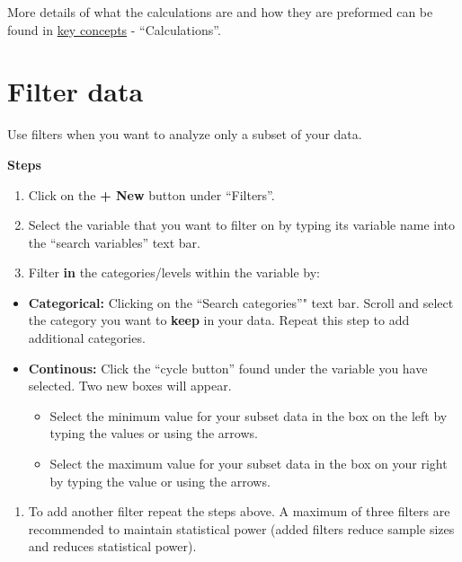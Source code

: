 \documentclass[]{book}
\providecommand{\tightlist}{%
  \setlength{\itemsep}{0pt}\setlength{\parskip}{0pt}}
\begin{document}
More details of what the calculations are and how they are preformed can
be found in \protect\hyperlink{keyconcepts}{key concepts} -
``Calculations''.

\section{Filter data}\label{filter-data}

Use filters when you want to analyze only a subset of your data.

\textbf{Steps}

\begin{enumerate}
\def\labelenumi{\arabic{enumi}.}
\item
  Click on the \textbf{+ New} button under ``Filters''.
\item
  Select the variable that you want to filter on by typing its variable
  name into the ``search variables'' text bar.
\item
  Filter \textbf{in} the categories/levels within the variable by:
\end{enumerate}

\begin{itemize}
\item
  \textbf{Categorical:} Clicking on the ``Search categories''" text bar.
  Scroll and select the category you want to \textbf{keep} in your data.
  Repeat this step to add additional categories.
\item
  \textbf{Continous:} Click the ``cycle button'' found under the
  variable you have selected. Two new boxes will appear.

  \begin{itemize}
  \tightlist
  \item
    Select the minimum value for your subset data in the box on the left
    by typing the values or using the arrows.
  \item
    Select the maximum value for your subset data in the box on your
    right by typing the value or using the arrows.
  \end{itemize}
\end{itemize}

\begin{enumerate}
\def\labelenumi{\arabic{enumi}.}
\setcounter{enumi}{3}
\tightlist
\item
  To add another filter repeat the steps above. A maximum of three
  filters are recommended to maintain statistical power (added filters
  reduce sample sizes and reduces statistical power).
\end{enumerate}
\end{document}
